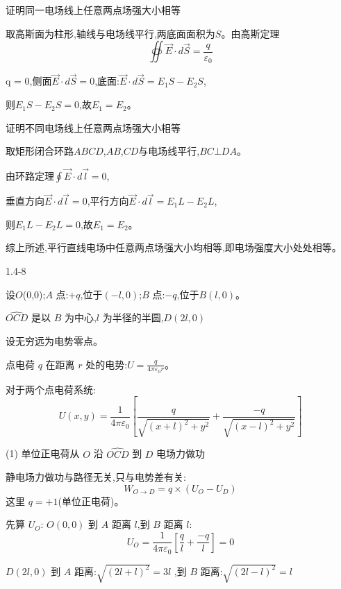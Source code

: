 \documentclass{article}
\begin{document}
证明同一电场线上任意两点场强大小相等

取高斯面为柱形,轴线与电场线平行,两底面面积为$S$。由高斯定理
$$\oiint \vec{E} \cdot d\vec{S} = \frac{q}{\varepsilon_0}$$

q = 0,侧面$\vec{E} \cdot d\vec{S} = 0$,底面:$\vec{E} \cdot d\vec{S} = E_1 S - E_2 S$,

则$E_1 S - E_2 S = 0$,故$E_1 = E_2$。

证明不同电场线上任意两点场强大小相等

取矩形闭合环路$ABCD$,$AB$,$CD$与电场线平行,$BC \bot DA$。

由环路定理$\oint \vec{E} \cdot d\vec{l} = 0$,

垂直方向$\vec{E} \cdot d\vec{l} = 0$,平行方向$\vec{E} \cdot d\vec{l} = E_1 L - E_2 L$,

则$E_1 L - E_2 L = 0$,故$E_1 = E_2$。

综上所述,平行直线电场中任意两点场强大小均相等,即电场强度大小处处相等。




\newpage

1.4-8





设$O$(0,0);$A$ 点:$+q$,位于$(-l,0)$;$B$ 点:$-q$,位于$B(l,0)$。

 $\widehat{OCD}$ 是以 $B$ 为中心,$l$ 为半径的半圆,$D(2l,0)$


设无穷远为电势零点。

点电荷 $q$ 在距离 $r$ 处的电势:$U = \frac{q}{4\pi\varepsilon_0 r}$。

对于两个点电荷系统:
$$U(x,y) = \frac{1}{4\pi\varepsilon_0} \left[ \frac{q}{\sqrt{(x+l)^2 + y^2}} + \frac{-q}{\sqrt{(x-l)^2 + y^2}} \right]$$


(1) 单位正电荷从 $O$ 沿 $\widehat{OCD}$ 到 $D$ 电场力做功

静电场力做功与路径无关,只与电势差有关:
$$W_{O\to D} = q \times (U_O - U_D)$$
\qquad 这里 $q = +1$(单位正电荷)。

先算 $U_O$:  
$O(0,0)$ 到 $A$ 距离 $l$,到 $B$ 距离 $l$:
$$U_O = \frac{1}{4\pi\varepsilon_0} \left[ \frac{q}{l} + \frac{-q}{l} \right] = 0$$

$D(2l,0)$ 到 $A$ 距离:$\sqrt{(2l+l)^2} = 3l$ ,到 $B$ 距离:$\sqrt{(2l-l)^2} = l$
\end{document}
